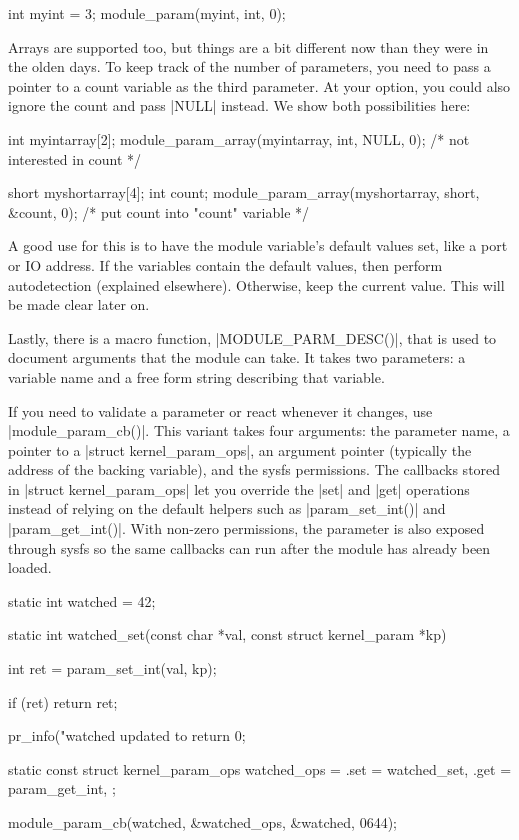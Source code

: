 \documentclass[10pt, oneside]{book}
\begin{document}
\begin{code}
int myint = 3;
module_param(myint, int, 0);
\end{code}

Arrays are supported too, but things are a bit different now than they were in the olden days.
To keep track of the number of parameters, you need to pass a pointer to a count variable as the third parameter.
At your option, you could also ignore the count and pass \cpp|NULL| instead.
We show both possibilities here:

\begin{code}
int myintarray[2];
module_param_array(myintarray, int, NULL, 0); /* not interested in count */

short myshortarray[4];
int count;
module_param_array(myshortarray, short, &count, 0); /* put count into "count" variable */
\end{code}

A good use for this is to have the module variable's default values set, like a port or IO address.
If the variables contain the default values, then perform autodetection (explained elsewhere).
Otherwise, keep the current value.
This will be made clear later on.

Lastly, there is a macro function, \cpp|MODULE_PARM_DESC()|, that is used to document arguments that the module can take.
It takes two parameters: a variable name and a free form string describing that variable.


If you need to validate a parameter or react whenever it changes, use \cpp|module_param_cb()|.
This variant takes four arguments: the parameter name, a pointer to a \cpp|struct kernel_param_ops|,
an argument pointer (typically the address of the backing variable), and the sysfs permissions.
The callbacks stored in \cpp|struct kernel_param_ops| let you override the \cpp|set| and \cpp|get|
operations instead of relying on the default helpers such as \cpp|param_set_int()| and \cpp|param_get_int()|.
With non-zero permissions, the parameter is also exposed through sysfs so the same callbacks can run after the module has already been loaded.

\begin{code}
static int watched = 42;

static int watched_set(const char *val, const struct kernel_param *kp)
{
    int ret = param_set_int(val, kp);

    if (ret)
        return ret;

    pr_info("watched updated to %
    return 0;
}

static const struct kernel_param_ops watched_ops = {
    .set = watched_set,
    .get = param_get_int,
};

module_param_cb(watched, &watched_ops, &watched, 0644);
\end{code}
\end{document}
